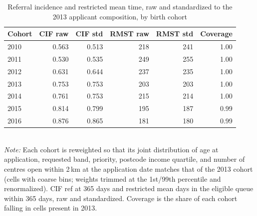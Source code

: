 \begin{table}[htbp]\centering
\caption{Referral incidence and restricted mean time, raw and standardized to the 2013 applicant composition, by birth cohort}
\label{tab:E3}
\footnotesize
\setlength{\tabcolsep}{4pt}
\begin{tabular}{lrrrrr}
\toprule
Cohort & CIF raw & CIF std & RMST raw & RMST std & Coverage \\
\midrule
2010 & 0.563 & 0.513 & 218 & 241 & 1.00 \\
2011 & 0.530 & 0.535 & 249 & 255 & 1.00 \\
2012 & 0.631 & 0.644 & 237 & 235 & 1.00 \\
2013 & 0.753 & 0.753 & 203 & 203 & 1.00 \\
2014 & 0.761 & 0.753 & 215 & 214 & 1.00 \\
2015 & 0.814 & 0.799 & 195 & 187 & 0.99 \\
2016 & 0.876 & 0.865 & 181 & 180 & 0.99 \\
\bottomrule
\end{tabular}
\\[3pt]{\footnotesize \textit{Note:} Each cohort is reweighted so that its joint distribution of age at application, requested band, priority, postcode income quartile, and number of centres open within 2\,km at the application date matches that of the 2013 cohort (cells with coarse bins; weights trimmed at the 1st/99th percentile and renormalized). CIF ref at 365 days and restricted mean days in the eligible queue within 365 days, raw and standardized. Coverage is the share of each cohort falling in cells present in 2013.}
\end{table}
